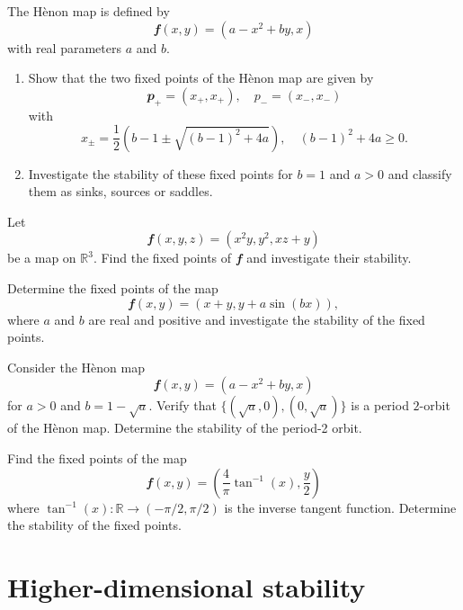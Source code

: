 \documentclass[
  a4paper,
  oneside,
  final]{krantz}
\providecommand{\tightlist}{%
  \setlength{\itemsep}{0pt}\setlength{\parskip}{0pt}}
\newcommand{\bblockT}[2][Task]{\begin{tcolorbox}[title = #1, parbox = false]}
\newcommand{\eblockT}{\end{tcolorbox}}
\newcommand{\R}{\mathbb{R}}
\renewcommand{\v}[1]{{\mathbfit{#1}}}
\theoremstyle{definition}
\theoremstyle{definition}
\theoremstyle{definition}
\theoremstyle{definition}
\theoremstyle{remark}
\begin{document}
\hypertarget{tsk7}{}\bblockT[Question 1]{\phantomsection\label{sol7}7}

The Hènon map is defined by
\[\v{f}(x,y) = (a-x^2 + by,x)\]
with real parameters \(a\) and \(b\).

\begin{enumerate}
\def\labelenumi{\alph{enumi}.}
\tightlist
\item
  Show that the two fixed points of the Hènon map are given by
  \[\v{p}_{+} = (x_{+}, x_{+}), \quad p_{-} = (x_{-}, x_{-})\]
  with
  \[ x_{\pm} = \frac{1}{2} \left(b - 1 \pm \sqrt{(b-1)^2 + 4a} \right), \quad (b-1)^2 + 4a \ge 0.\]
\item
  Investigate the stability of these fixed points for \(b=1\) and \(a > 0\) and classify them as sinks, sources or saddles.
\end{enumerate}

\eblockT

\hypertarget{tsk8}{}\bblockT[Question 2]{\phantomsection\label{sol8}8}

Let
\[\v{f}(x,y,z) = (x^2y, y^2, xz + y)\]
be a map on \(\R^3\). Find the fixed points of \(\v{f}\) and investigate their stability.

\eblockT

\hypertarget{tsk9}{}\bblockT[Question 3]{\phantomsection\label{sol9}9}

Determine the fixed points of the map
\[\v{f}(x,y) = (x+y,y+a\sin(bx)),\]
where \(a\) and \(b\) are real and positive and investigate the stability of the fixed points.

\eblockT

\hypertarget{tsk10}{}\bblockT[Question 4]{\phantomsection\label{sol10}10}

Consider the Hènon map
\[\v{f}(x,y) = (a-x^2 + by,x)\]
for \(a>0\) and \(b = 1- \sqrt{a}\). Verify that \(\{(\sqrt{a},0),(0,\sqrt{a})\}\) is a period \(2\)-orbit of the Hènon map. Determine the stability of the period-2 orbit.
\eblockT

\hypertarget{tsk11}{}\bblockT[Question 5]{\phantomsection\label{sol11}11}

Find the fixed points of the map
\[\v{f}(x,y) = \left(\frac{4}{\pi}\tan^{-1}(x), \frac{y}{2}\right)\]
where \(\tan^{-1}(x): \R \to (-\pi/2, \pi/2)\) is the inverse tangent function. Determine the stability of the fixed points.

\eblockT

\hypertarget{Higherdimstability}{%
\chapter{Higher-dimensional stability}\label{Higherdimstability}}
\end{document}
